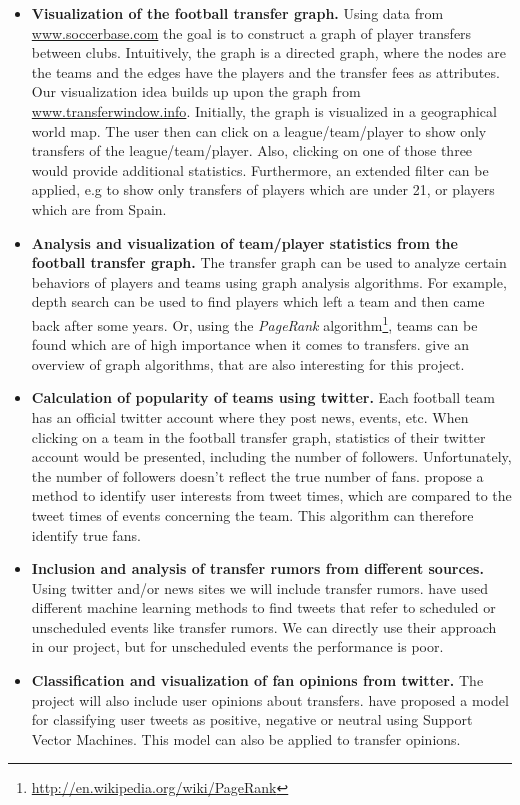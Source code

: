 \documentclass{article}
\begin{document}
\begin{itemize}
	\item \textbf{Visualization of the football transfer graph.} Using data from \url{www.soccerbase.com} the goal is to construct a graph of player transfers between clubs. Intuitively, the graph is a directed graph, where the nodes are the teams and the edges have the players and the transfer fees as attributes. Our visualization idea builds up upon the graph from \url{www.transferwindow.info}. Initially, the graph is visualized in a geographical world map. The user then can click on a league/team/player to show only transfers of the league/team/player. Also, clicking on one of those three would provide additional statistics. Furthermore, an extended filter can be applied, e.g to show only transfers of players which are under 21, or players which are from Spain.
	
	\item \textbf{Analysis and visualization of team/player statistics from the football transfer graph.} The transfer graph can be used to analyze certain behaviors of players and teams using graph analysis algorithms. For example, depth search can be used to find players which left a team and then came back after some years. Or, using the \emph{PageRank} algorithm\footnote{\url{http://en.wikipedia.org/wiki/PageRank}}, teams can be found which are of high importance when it comes to transfers. \cite{brath} give an overview of graph algorithms, that are also interesting for this project.
	
	\item \textbf{Calculation of popularity of teams using twitter.} Each football team has an official twitter account where they post news, events, etc. When clicking on a team in the football transfer graph, statistics of their twitter account would be presented, including the number of followers. Unfortunately, the number of followers doesn't reflect the true number of fans. \cite{Ramasamy:2013:IUI:2512938.2512960} propose a method to identify user interests from tweet times, which are compared to the tweet times of events concerning the team. This algorithm can therefore identify true fans.
	
	\item \textbf{Inclusion and analysis of transfer rumors from different sources.} Using twitter and/or news sites we will include transfer rumors. \cite{Kunneman+12} have used different machine learning methods to find tweets that refer to scheduled or unscheduled events like transfer rumors. We can directly use their approach in our project, but for unscheduled events the performance is poor.
	
	\item \textbf{Classification and visualization of fan opinions from twitter.} The project will also include user opinions about transfers. \cite{Shrivatava2014} have proposed a model for classifying user tweets as positive, negative or neutral using Support Vector Machines. This model can also be applied to transfer opinions.
\end{itemize}
\end{document}
